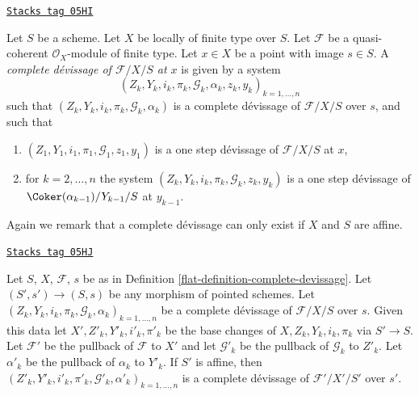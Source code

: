 \begin{definition}
\label{flat-definition-complete-devissage-at-x}
\href{https://stacks.math.columbia.edu/tag/05HI}{\texttt{Stacks tag 05HI}}

Let $S$ be a scheme.
Let $X$ be locally of finite type over $S$.
Let $\mathcal{F}$ be a quasi-coherent $\mathcal{O}_X$-module of finite type.
Let $x \in X$ be a point with image $s \in S$.
A {\it complete d\'evissage of $\mathcal{F}/X/S$ at $x$} is given by a
system
$$
(Z_k, Y_k, i_k, \pi_k, \mathcal{G}_k, \alpha_k, z_k, y_k)_{k = 1, \ldots, n}
$$
such that $(Z_k, Y_k, i_k, \pi_k, \mathcal{G}_k, \alpha_k)$ is a
complete d\'evissage of $\mathcal{F}/X/S$ over $s$, and such that
\begin{enumerate}
\item $(Z_1, Y_1, i_1, \pi_1, \mathcal{G}_1, z_1, y_1)$ is a one step
d\'evissage of $\mathcal{F}/X/S$ at $x$,
\item for $k = 2, \ldots, n$ the system
$(Z_k, Y_k, i_k, \pi_k, \mathcal{G}_k, z_k, y_k)$
is a one step d\'evissage of $\Coker(\alpha_{k - 1})/Y_{k - 1}/S$
at $y_{k - 1}$.
\end{enumerate}
\end{definition}

Again we remark that a complete d\'evissage can only exist if $X$ and
$S$ are affine.

\begin{lemma}
\label{flat-lemma-base-change-complete}
\href{https://stacks.math.columbia.edu/tag/05HJ}{\texttt{Stacks tag 05HJ}}

Let $S$, $X$, $\mathcal{F}$, $s$ be as in
Definition \ref{flat-definition-complete-devissage}.
Let $(S', s') \to (S, s)$ be any morphism of pointed schemes.
Let $(Z_k, Y_k, i_k, \pi_k, \mathcal{G}_k, \alpha_k)_{k = 1, \ldots, n}$
be a complete d\'evissage of $\mathcal{F}/X/S$ over $s$.
Given this data let $X', Z'_k, Y'_k, i'_k, \pi'_k$ be the base
changes of $X, Z_k, Y_k, i_k, \pi_k$ via $S' \to S$.
Let $\mathcal{F}'$ be the pullback of $\mathcal{F}$ to $X'$
and let $\mathcal{G}'_k$ be the pullback of $\mathcal{G}_k$ to $Z'_k$.
Let $\alpha'_k$ be the pullback of $\alpha_k$ to $Y'_k$.
If $S'$ is affine, then
$(Z'_k, Y'_k, i'_k, \pi'_k, \mathcal{G}'_k, \alpha'_k)_{k = 1, \ldots, n}$
is a complete d\'evissage of $\mathcal{F}'/X'/S'$ over $s'$.
\end{lemma}


